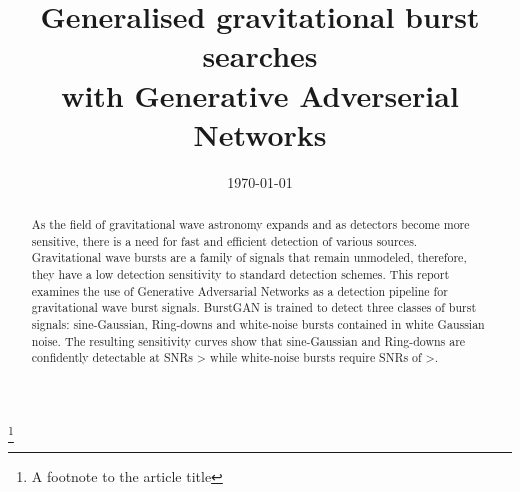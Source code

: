 \documentclass[%
 reprint,
 amsmath,amssymb,
 aps,
]{revtex4-2}
\begin{document}

\title{Generalised gravitational burst searches \\with Generative Adverserial Networks}%
\thanks{A footnote to the article title}%


 \email{}
%


\date{\today}%

\begin{abstract}
As the field of gravitational wave astronomy expands and as detectors become more sensitive, there is a need for fast and efficient detection of various sources. Gravitational wave bursts are a family of signals that remain unmodeled, therefore, they have a low detection sensitivity to standard detection schemes. This report examines the use of Generative Adversarial Networks as a detection pipeline for gravitational wave burst signals. BurstGAN is trained to detect three classes of burst signals: sine-Gaussian, Ring-downs and white-noise bursts contained in white Gaussian noise. The resulting sensitivity curves show that sine-Gaussian and Ring-downs are confidently detectable at SNRs > while white-noise bursts require SNRs of >.
\end{abstract}

\maketitle
\end{document}
